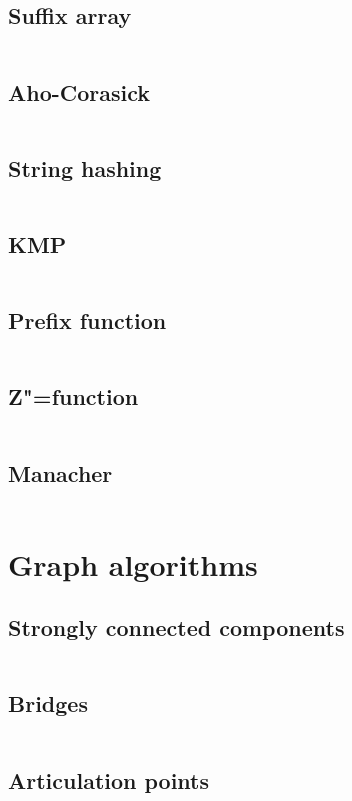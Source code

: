 ﻿\documentclass[10pt,twocolumn,oneside]{article}
\begin{document}
\subsection{Suffix array}
\inputminted[breaklines]{cpp}{String algorithms/suffix array.cpp}
\subsection{Aho-Corasick}
\inputminted[breaklines]{cpp}{String algorithms/aho-corasick.cpp}
\subsection{String hashing}
\inputminted[breaklines]{cpp}{String algorithms/string hashing.cpp}
\subsection{KMP}
\inputminted[breaklines]{python}{String algorithms/kmp.py}
\subsection{Prefix function}
\inputminted[breaklines]{cpp}{String algorithms/prefix-function.cpp}
\subsection{Z"=function}
\inputminted[breaklines]{cpp}{String algorithms/z-function.cpp}
\subsection{Manacher}
\inputminted[breaklines]{cpp}{String algorithms/manacher.cpp}

\section{Graph algorithms}
\subsection{Strongly connected components}
\inputminted[breaklines]{cpp}{Graph algorithms/strongly connected components.cpp}
\subsection{Bridges}
\inputminted[breaklines]{cpp}{Graph algorithms/bridges.cpp}
\subsection{Articulation points}
\inputminted[breaklines]{cpp}{Graph algorithms/articulation points.cpp}
\end{document}
